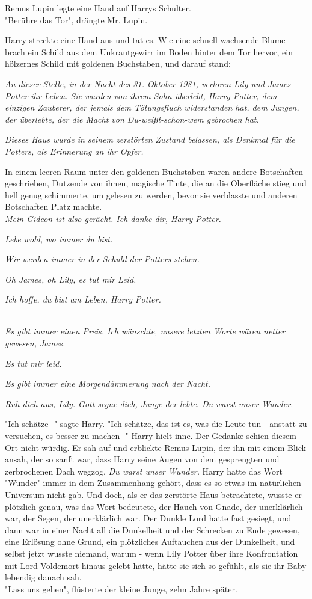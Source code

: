 {Remus Lupin legte eine Hand auf Harrys Schulter.\\ "Berühre das Tor", drängte Mr. Lupin.

Harry streckte eine Hand aus und tat es. Wie eine schnell wachsende Blume brach ein Schild aus dem Unkrautgewirr im Boden hinter dem Tor hervor, ein hölzernes Schild mit goldenen Buchstaben, und darauf stand:

\emph{An dieser Stelle, in der Nacht des 31. Oktober 1981, verloren Lily und James Potter ihr Leben. Sie wurden von ihrem Sohn überlebt, Harry Potter, dem einzigen Zauberer, der jemals dem Tötungsfluch widerstanden hat, dem Jungen, der überlebte, der die Macht von Du-weißt-schon-wem gebrochen hat.}

\emph{Dieses Haus wurde in seinem zerstörten Zustand belassen, als Denkmal für die Potters, als Erinnerung an ihr Opfer.}

In einem leeren Raum unter den goldenen Buchstaben waren andere Botschaften geschrieben, Dutzende von ihnen, magische Tinte, die an die Oberfläche stieg und hell genug schimmerte, um gelesen zu werden, bevor sie verblasste und anderen Botschaften Platz machte.\\ \emph{Mein Gideon ist also gerächt. Ich danke dir, Harry Potter.}

\emph{Lebe wohl, wo immer du bist.}

\emph{Wir werden immer in der Schuld der Potters stehen.}

\emph{Oh James, oh Lily, es tut mir Leid.}

\emph{Ich hoffe, du bist am Leben, Harry Potter.}\\ \strut \\ \emph{Es gibt immer einen Preis. Ich wünschte, unsere letzten Worte wären netter gewesen, James.}

\emph{Es tut mir leid.}

\emph{Es gibt immer eine Morgendämmerung nach der Nacht.}

\emph{Ruh dich aus, Lily. Gott segne dich, Junge-der-lebte. Du warst unser Wunder.}

"Ich schätze -" sagte Harry. "Ich schätze, das ist es, was die Leute tun - anstatt zu versuchen, es besser zu machen -" Harry hielt inne. Der Gedanke schien diesem Ort nicht würdig. Er sah auf und erblickte Remus Lupin, der ihn mit einem Blick ansah, der so sanft war, dass Harry seine Augen von dem gesprengten und zerbrochenen Dach wegzog. \emph{Du warst unser Wunder.} Harry hatte das Wort "Wunder" immer in dem Zusammenhang gehört, dass es so etwas im natürlichen Universum nicht gab. Und doch, als er das zerstörte Haus betrachtete, wusste er plötzlich genau, was das Wort bedeutete, der Hauch von Gnade, der unerklärlich war, der Segen, der unerklärlich war. Der Dunkle Lord hatte fast gesiegt, und dann war in einer Nacht all die Dunkelheit und der Schrecken zu Ende gewesen, eine Erlösung ohne Grund, ein plötzliches Auftauchen aus der Dunkelheit, und selbst jetzt wusste niemand, warum - wenn Lily Potter über ihre Konfrontation mit Lord Voldemort hinaus gelebt hätte, hätte sie sich so gefühlt, als sie ihr Baby lebendig danach sah.\\ "Lass uns gehen", flüsterte der kleine Junge, zehn Jahre später.

}
